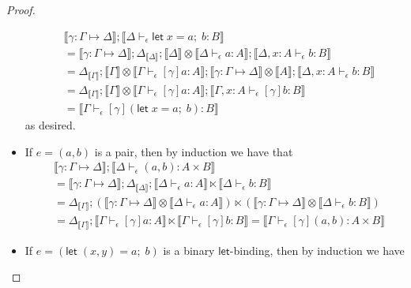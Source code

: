 \documentclass[acmsmall,screen,review]{acmart}
\newcommand{\ms}[1]{\ensuremath{\mathsf{#1}}}
\newcommand{\letexpr}[3]{\ensuremath{\ms{let}\;#1 = #2;\;#3}}
\newcommand{\bhyp}[2]{#1 : #2}
\newcommand{\hasty}[4]{#1 \vdash_{#2} #3: {#4}}
\newcommand{\issubst}[3]{#1: #2 \mapsto #3}
\newcommand{\dnt}[1]{\llbracket{#1}\rrbracket}
\begin{document}
\begin{proof}
\begin{itemize}[leftmargin=*]
    \begin{equation}
      \begin{aligned}
        & \dnt{\issubst{\gamma}{\Gamma}{\Delta}} 
        ; \dnt{\hasty{\Delta}{\epsilon}{\letexpr{x}{a}{b}}{B}} \\
        &= \dnt{\issubst{\gamma}{\Gamma}{\Delta}}
        ; \Delta_{\dnt{\Delta}} ; \dnt{\Delta} \otimes \dnt{\hasty{\Delta}{\epsilon}{a}{A}}
        ; \dnt{\hasty{\Delta, \bhyp{x}{A}}{\epsilon}{b}{B}} \\
        &= \Delta_{\dnt{\Gamma}} 
        ; \dnt{\Gamma} 
          \otimes \dnt{\hasty{\Gamma}{\epsilon}{[\gamma]a}{A}}
        ; \dnt{\issubst{\gamma}{\Gamma}{\Delta}} \otimes \dnt{A}
        ; \dnt{\hasty{\Delta, \bhyp{x}{A}}{\epsilon}{b}{B}} \\
        &= \Delta_{\dnt{\Gamma}}
        ; \dnt{\Gamma} \otimes \dnt{\hasty{\Gamma}{\epsilon}{[\gamma]a}{A}}
        ; \dnt{\hasty{\Gamma, \bhyp{x}{A}}{\epsilon}{[\gamma]b}{B}} \\
        &= \dnt{\hasty{\Gamma}{\epsilon}{[\gamma](\letexpr{x}{a}{b})}{B}}
      \end{aligned}
    \end{equation}
    as desired.
    \item If $e = (a, b)$ is a pair, then by induction we have that
    \begin{equation}
      \begin{aligned}
      &\dnt{\issubst{\gamma}{\Gamma}{\Delta}} ; \dnt{\hasty{\Delta}{\epsilon}{(a, b)}{A \times B}} 
      \\
      &= \dnt{\issubst{\gamma}{\Gamma}{\Delta}} 
        ; \Delta_{\dnt{\Delta}} 
        ; \dnt{\hasty{\Delta}{\epsilon}{a}{A}} \ltimes \dnt{\hasty{\Delta}{\epsilon}{b}{B}}
      \\
      &= \Delta_{\dnt{\Gamma}} ; 
        (\dnt{\issubst{\gamma}{\Gamma}{\Delta}} \otimes \dnt{\hasty{\Delta}{\epsilon}{a}{A}})
        \ltimes 
        (\dnt{\issubst{\gamma}{\Gamma}{\Delta}} \otimes \dnt{\hasty{\Delta}{\epsilon}{b}{B}})
      \\
      &= \Delta_{\dnt{\Gamma}} ; 
        \dnt{\hasty{\Gamma}{\epsilon}{[\gamma]a}{A}} 
        \ltimes \dnt{\hasty{\Gamma}{\epsilon}{[\gamma]b}{B}}
      = \dnt{\hasty{\Gamma}{\epsilon}{[\gamma](a, b)}{A \times B}}
      \end{aligned}
    \end{equation}
    \item If $e = (\letexpr{(x, y)}{a}{b})$ is a binary \ms{let}-binding, then by induction we have

\end{itemize}
\end{proof}
\end{document}
